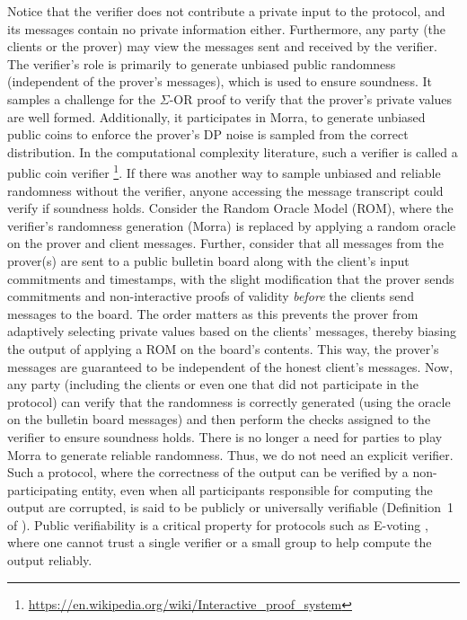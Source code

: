 Notice that the verifier does not contribute a private input to the protocol, and its messages contain no private information either. 
Furthermore, any party (the clients or the prover) may view the messages sent and received by the verifier.
The verifier's role is primarily to generate unbiased public randomness (independent of the prover's messages), which is used to ensure soundness. 
It samples a challenge for the $\Sigma$-OR proof to verify that the prover's private values are well formed.
Additionally, it participates in Morra, to generate unbiased public coins to enforce the prover's DP noise is sampled from the correct distribution. 
In the computational complexity literature, such a verifier is called a public coin verifier \footnote{\url{https://en.wikipedia.org/wiki/Interactive_proof_system}}. 
If there was another way to sample unbiased and reliable randomness without the verifier, anyone accessing the message transcript could verify if soundness holds.  Consider the Random Oracle Model (ROM), where the verifier's randomness generation (Morra) is replaced by applying a random oracle on the prover and client messages.
Further, consider that all messages from the prover(s) are sent to a public bulletin board along with the client's input commitments and timestamps, with the slight modification that the prover sends commitments and non-interactive proofs of validity \textit{before} the clients send messages to the board. 
The order matters as this prevents the prover from adaptively selecting private values based on the clients' messages, thereby biasing the output of applying a ROM on the board's contents. This way, the prover's messages are guaranteed to be independent of the honest client's messages.
Now, any party (including the clients or even one that did not participate in the protocol) can verify that the randomness is correctly generated (using the oracle on the bulletin board messages) and then perform the checks assigned to the verifier to ensure soundness holds. 
There is no longer a need for parties to play Morra to generate reliable randomness.
Thus, we do not need an explicit verifier.
Such a protocol, where the correctness of the output can be verified by a non-participating entity, even when all participants responsible for computing the output are corrupted, is said to be publicly or universally verifiable (Definition~1 of \cite{baum2014publicly}). Public verifiability is a critical property for protocols such as E-voting \cite{harrison2022vericondor}, where one cannot trust a single verifier or a small group to help compute the output reliably. 
